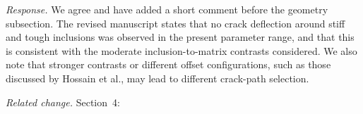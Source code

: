 \documentclass[a4paper,11pt]{article}
\begin{document}
\emph{Response.} We agree and have added a short comment before the
geometry subsection. The revised manuscript states that no crack
deflection around stiff and tough inclusions was observed in the
present parameter range, and that this is consistent with the
moderate inclusion-to-matrix contrasts considered. We also note that
stronger contrasts or different offset configurations, such as those
discussed by Hossain et al., may lead to different crack-path
selection.

\emph{Related change.} Section~4:
\begin{quote}
\end{quote}
\end{document}
